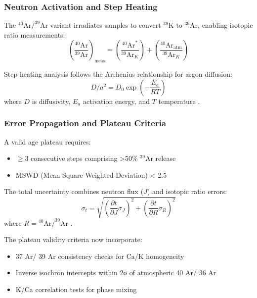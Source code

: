 \documentclass{article}
\begin{document}
\subsubsection*{Neutron Activation and Step Heating}
The \(^{40}\text{Ar}/^{39}\text{Ar}\) variant irradiates samples to convert \(^{39}\text{K}\) to \(^{39}\text{Ar}\), enabling isotopic ratio measurements:
\begin{equation}
    \left(\frac{{}^{40}\text{Ar}}{{}^{39}\text{Ar}}\right)_{\text{meas}} = \left(\frac{{}^{40}\text{Ar}^*}{{}^{39}\text{Ar}_K}\right) + \left(\frac{{}^{40}\text{Ar}_{\text{atm}}}{{}^{39}\text{Ar}_K}\right)
    \label{eq:ar_ratio}
\end{equation}

Step-heating analysis follows the Arrhenius relationship for argon diffusion:
\begin{equation}
    D/a^2 = D_0 \exp\left(-\frac{E_a}{RT}\right)
    \label{eq:arrhenius}
\end{equation}
where \(D\) is diffusivity, \(E_a\) activation energy, and \(T\) temperature \cite{Mcdougall1999}.

\subsubsection*{Error Propagation and Plateau Criteria}
A valid age plateau requires:
\begin{itemize}
    \item \(\geq 3\) consecutive steps comprising >50\% \(^{39}\text{Ar}\) release
    \item MSWD (Mean Square Weighted Deviation) < 2.5 \cite{René2018}
\end{itemize}

The total uncertainty combines neutron flux (\(J\)) and isotopic ratio errors:
\begin{equation}
    \sigma_t = \sqrt{\left(\frac{\partial t}{\partial J}\sigma_J\right)^2 + \left(\frac{\partial t}{\partial R}\sigma_R\right)^2}
    \label{eq:ar_error}
\end{equation}
where \(R = {}^{40}\text{Ar}/^{39}\text{Ar}\) \cite{Koppers2002}.

The plateau validity criteria now incorporate:
\begin{itemize}
\item  
37
 Ar/ 
39
 Ar consistency checks for Ca/K homogeneity
\item Inverse isochron intercepts within 2σ of atmospheric  
40
 Ar/ 
36
 Ar
\item K/Ca correlation tests for phase mixing 
\end{itemize}
\end{document}
